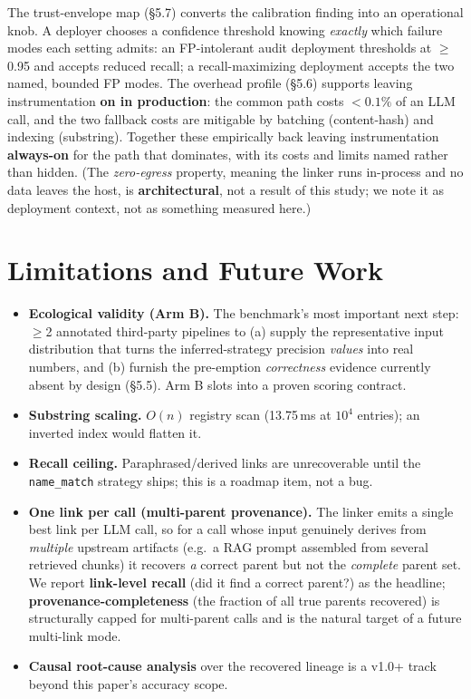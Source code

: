 \documentclass[11pt]{article}
\begin{document}
The trust-envelope map (\S5.7) converts the calibration finding into an operational knob. A deployer chooses
a confidence threshold knowing \emph{exactly} which failure modes each setting admits: an FP-intolerant
audit deployment thresholds at $\geq$0.95 and accepts reduced recall; a recall-maximizing deployment accepts
the two named, bounded FP modes. The overhead profile (\S5.6) supports leaving instrumentation \textbf{on in
production}: the common path costs $<0.1\%$ of an LLM call, and the two fallback costs are mitigable by
batching (content-hash) and indexing (substring). Together these empirically back leaving instrumentation
\textbf{always-on} for the path that dominates, with its costs and limits named rather than hidden. (The
\emph{zero-egress} property, meaning the linker runs in-process and no data leaves the host, is
\textbf{architectural}, not a result of this study; we note it as deployment context, not as something
measured here.)

\section{Limitations and Future Work}
\begin{itemize}[leftmargin=*]
\item \textbf{Ecological validity (Arm B).} The benchmark's most important next step: $\geq$2 annotated
third-party pipelines to (a) supply the representative input distribution that turns the inferred-strategy
precision \emph{values} into real numbers, and (b) furnish the pre-emption \emph{correctness} evidence
currently absent by design (\S5.5). Arm B slots into a proven scoring contract.
\item \textbf{Substring scaling.} $O(n)$ registry scan (13.75\,ms at $10^4$ entries); an inverted index
would flatten it.
\item \textbf{Recall ceiling.} Paraphrased/derived links are unrecoverable until the \texttt{name\_match}
strategy ships; this is a roadmap item, not a bug.
\item \textbf{One link per call (multi-parent provenance).} The linker emits a single best link per LLM
call, so for a call whose input genuinely derives from \emph{multiple} upstream artifacts (e.g.\ a RAG
prompt assembled from several retrieved chunks) it recovers \emph{a} correct parent but not the
\emph{complete} parent set. We report \textbf{link-level recall} (did it find a correct parent?) as the
headline; \textbf{provenance-completeness} (the fraction of all true parents recovered) is structurally
capped for multi-parent calls and is the natural target of a future multi-link mode.
\item \textbf{Causal root-cause analysis} over the recovered lineage is a v1.0+ track beyond this paper's
accuracy scope.
\end{itemize}
\end{document}

